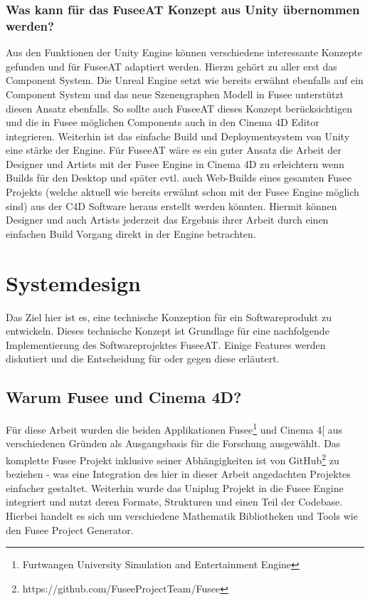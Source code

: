 \documentclass[pagesize, paper=a4, fontsize=12pt, titlepage=true, headings=small, headnosepline, abstractoff, liststotoc, nochapterprefix, plainheadsepline, twoside]{scrreprt}
\newcommand{\CSS}{C\texttt{\# }}
\begin{document}
\subsubsection{Was kann für das FuseeAT Konzept aus Unity übernommen werden?}
Aus den Funktionen der Unity Engine können verschiedene interessante Konzepte gefunden und für FuseeAT adaptiert werden. Hierzu gehört zu aller erst das Component System. Die Unreal Engine setzt wie bereits erwähnt ebenfalls auf ein Component System und das neue Szenengraphen Modell in Fusee unterstützt diesen Ansatz ebenfalls. So sollte auch FuseeAT dieses Konzept berücksichtigen und die in Fusee möglichen Components auch in den Cinema 4D Editor integrieren. Weiterhin ist das einfache Build und Deploymentsystem von Unity eine stärke der Engine. Für FuseeAT wäre es ein guter Ansatz die Arbeit der Designer und Artists mit der Fusee Engine in Cinema 4D zu erleichtern wenn Builds für den Desktop und später evtl. auch Web-Builds eines gesamten Fusee Projekts (welche aktuell wie bereits erwähnt schon mit der Fusee Engine möglich sind) aus der C4D Software heraus erstellt werden könnten. Hiermit können  Designer und auch Artists jederzeit das Ergebnis ihrer Arbeit durch einen einfachen Build Vorgang direkt in der Engine betrachten.




\section{Systemdesign}
Das Ziel hier ist es, eine technische Konzeption für ein Softwareprodukt zu entwickeln. Dieses technische Konzept ist Grundlage für eine nachfolgende Implementierung des Softwareprojektes FuseeAT. Einige Features werden diskutiert und die Entscheidung für oder gegen diese erläutert.

\subsection{Warum Fusee und Cinema 4D?}
Für diese Arbeit wurden die beiden Applikationen Fusee\footnote{Furtwangen University Simulation and Entertainment Engine} und Cinema 4[\autocite{MaxonC4d2014} aus verschiedenen Gründen als Ausgangsbasis für die Forschung ausgewählt. Das komplette Fusee Projekt inklusive seiner Abhängigkeiten ist von GitHub\footnote{https://github.com/FuseeProjectTeam/Fusee} zu beziehen - was eine Integration des hier in dieser Arbeit angedachten Projektes einfacher gestaltet. Weiterhin wurde das Uniplug Projekt in die Fusee Engine integriert und nutzt deren Formate, Strukturen und einen Teil der Codebase. Hierbei handelt es sich um verschiedene Mathematik Bibliotheken und Tools wie den Fusee Project Generator.
\end{document}
